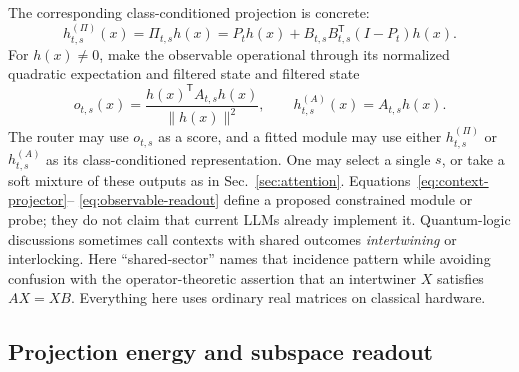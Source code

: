 \documentclass[
  aps,
  reprint,
  superscriptaddress,
  floatfix,
  nofootinbib,
  longbibliography
]{revtex4-2}
\newcommand{\T}{^{\mathsf{T}}}
\newcommand{\norm}[1]{\lVert #1 \rVert}
\begin{document}
The corresponding class-conditioned projection is concrete:
%
\begin{equation}
\label{eq:observable-embedding}
h_{t,s}^{(\Pi)}(x)
=\Pi_{t,s}h(x)
=P_t h(x)+B_{t,s}B_{t,s}\T(I-P_t)h(x).
\end{equation}
%
For $h(x)\ne0$, make the observable operational through its normalized
quadratic expectation and filtered state
and filtered state
\begin{equation}
\label{eq:observable-readout}
o_{t,s}(x)=
\frac{h(x)\T A_{t,s}h(x)}{\norm{h(x)}^2},
\qquad
h_{t,s}^{(A)}(x)=A_{t,s}h(x).
\end{equation}
The router may use $o_{t,s}$ as a score, and a fitted module may use either
$h_{t,s}^{(\Pi)}$ or $h_{t,s}^{(A)}$ as its class-conditioned representation.
One may select a single $s$, or take a soft mixture of these outputs as in
Sec.~\ref{sec:attention}.  Equations~\eqref{eq:context-projector}--
\eqref{eq:observable-readout} define a proposed constrained module or probe;
they do not claim that current LLMs already implement it.  Quantum-logic
discussions sometimes call contexts with shared outcomes \emph{intertwining}
or interlocking.  Here ``shared-sector'' names that incidence pattern while
avoiding confusion with the operator-theoretic assertion that an intertwiner
$X$ satisfies $AX=XB$.
Everything here uses ordinary real matrices on classical hardware.

\subsection{Projection energy and subspace readout}
\label{sec:gated}
\end{document}

